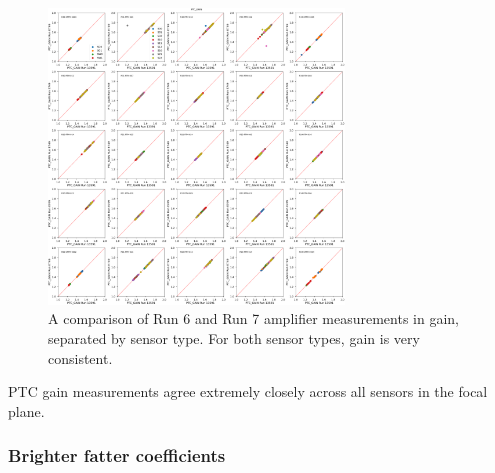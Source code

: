 \begin{figure}[ht]
\begin{centering}
\includegraphics[width=0.7\textwidth]{figures/baselineCharacterization/13591_E749_PTC_GAIN.png}
\caption{A comparison of Run 6 and Run 7 amplifier measurements in gain, separated by sensor type. For both sensor types, gain is very consistent.}
\end{centering}
\end{figure}

PTC gain measurements agree extremely closely across all sensors in the
focal plane.

\subsubsection{Brighter fatter coefficients}\label{brighter-fatter-a00-coefficient}



